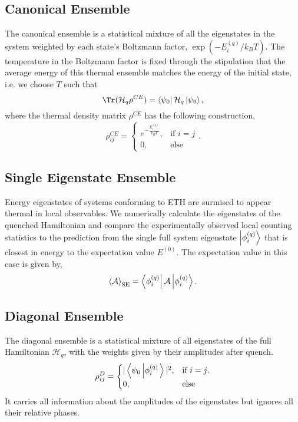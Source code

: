 \subsection*{Canonical Ensemble}
\label{sec:canonical}
The canonical ensemble is a statistical mixture of all the eigenstates in the
system weighted by each state's Boltzmann factor, $\exp(-E_i^{(q)}/k_BT)$. The
temperature in the Boltzmann factor is fixed through the stipulation that the
average energy of this thermal ensemble matches the energy of the initial state,
i.e. we choose $T$ such that
\[\Tr(\mathcal H_q \rho^{CE}) = \bra{\psi_0} \mathcal H_q \ket{\psi_0},\]
where the thermal density matrix $\rho^{CE}$ has the following construction,
\[\rho_{ij}^{CE} = 
\begin{cases} 
e^{-\frac{E_i^{(q)}}{k_B T}}, & \text{if $i = j$} \\
0, & \text{else}
\end{cases}.\]

\subsection*{Single Eigenstate Ensemble}
Energy eigenstates of systems conforming to ETH are surmised to appear thermal in local observables. We numerically calculate the eigenstates of the quenched Hamiltonian and compare the experimentally observed local counting statistics to the prediction from the single full system eigenstate $\left|\phi^{(q)}_i\right\rangle$ that is closest in energy to the expectation value $E^{(0)}$. The expectation value in this case is given by,
\[\left\langle \mathcal A\right\rangle_\text{SE} = \left\langle \phi^{(q)}_i\right| \mathcal A \left|\phi^{(q)}_i\right\rangle .\]

\subsection*{Diagonal Ensemble}
The diagonal ensemble is a statistical mixture of all eigenstates of the full Hamiltonian $\mathcal H_q$, with the weights given by their amplitudes after quench.
\[
\rho_{ij}^{D}=
\begin{cases}
|\left\langle \psi_0\left|\phi^{(q)}_i\right.\right\rangle|^2 , & \text{if $i=j$.} \\
0, & \text{else}
\end{cases}
\]
It carries all information about the amplitudes of the eigenstates but ignores all their relative phases.
%

